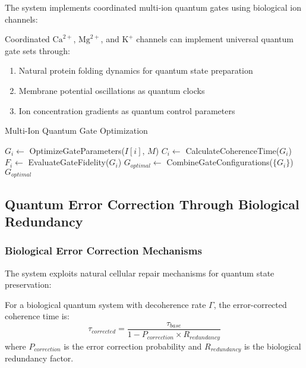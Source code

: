 ﻿\documentclass[11pt,a4paper]{article}
\begin{document}
The system implements coordinated multi-ion quantum gates using biological ion channels:

\begin{theorem}
Coordinated $\text{Ca}^{2+}$, $\text{Mg}^{2+}$, and $\text{K}^+$ channels can implement universal quantum gate sets through:
\begin{enumerate}
\item Natural protein folding dynamics for quantum state preparation
\item Membrane potential oscillations as quantum clocks
\item Ion concentration gradients as quantum control parameters
\end{enumerate}
\end{theorem}

\begin{algorithm}
\caption{Multi-Ion Quantum Gate Optimization}
\begin{algorithmic}
        \State $G_i \leftarrow$ OptimizeGateParameters($I[i]$, $M$)
        \State $C_i \leftarrow$ CalculateCoherenceTime($G_i$)
        \State $F_i \leftarrow$ EvaluateGateFidelity($G_i$)
    \EndFor
    \State $G_{optimal} \leftarrow$ CombineGateConfigurations($\{G_i\}$)
    \State \Return $G_{optimal}$
\EndProcedure
\end{algorithmic}
\end{algorithm}

\subsection{Quantum Error Correction Through Biological Redundancy}

\subsubsection{Biological Error Correction Mechanisms}

The system exploits natural cellular repair mechanisms for quantum state preservation:

\begin{definition}
For a biological quantum system with decoherence rate $\Gamma$, the error-corrected coherence time is:
\begin{equation}
\tau_{corrected} = \frac{\tau_{base}}{1 - P_{correction} \times R_{redundancy}}
\end{equation}
where $P_{correction}$ is the error correction probability and $R_{redundancy}$ is the biological redundancy factor.
\end{definition}
\end{document}
